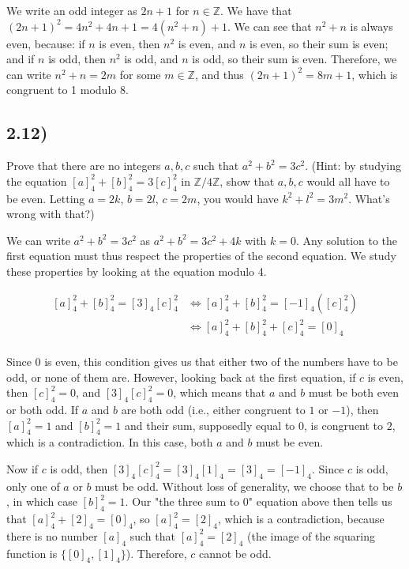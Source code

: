 \documentclass[12pt, letterpaper, twoside]{report}
\begin{document}
We write an odd integer as $2n + 1$ for $n \in \mathbb{Z}$. We have that $(2n + 1)^2 = 4n^2 + 4n + 1 = 4(n^2 + n) + 1$. We can see that $n^2 + n$ is always even, because: if $n$ is even, then $n^2$ is even, and $n$ is even, so their sum is even; and if $n$ is odd, then $n^2$ is odd, and $n$ is odd, so their sum is even. Therefore, we can write $n^2 + n = 2m$ for some $m \in \mathbb{Z}$, and thus $(2n + 1)^2 = 8m + 1$, which is congruent to 1 modulo 8.


\subsection*{2.12)}

Prove that there are no integers $a, b, c$ such that $a^2 + b^2 = 3c^2$. (Hint: by studying the equation $[a]^2_4 + [b]^2_4 = 3[c]^2_4$ in $\mathbb{Z}/4\mathbb{Z}$, show that $a, b, c$ would all have to be even. Letting $a = 2k$, $b = 2l$, $c = 2m$, you would have $k^2 + l^2 = 3m^2$. What's wrong with that?)

We can write $a^2 + b^2 = 3c^2$ as $a^2 + b^2 = 3c^2 + 4k$ with $k = 0$. Any solution to the first equation must thus respect the properties of the second equation. We study these properties by looking at the equation modulo 4.

$$
\begin{aligned}
[a]^2_4 + [b]^2_4 = [3]_4 [c]^2_4
&\Leftrightarrow [a]^2_4 + [b]^2_4 = [-1]_4 ([c]^2_4) \\
&\Leftrightarrow [a]^2_4 + [b]^2_4 + [c]^2_4 = [0]_4 \\
\end{aligned}
$$

Since 0 is even, this condition gives us that either two of the numbers have to be odd, or none of them are. However, looking back at the first equation, if $c$ is even, then $[c]^2_4 = 0$, and $[3]_4 [c]^2_4 = 0$, which means that $a$ and $b$ must be both even or both odd. If $a$ and $b$ are both odd (i.e., either congruent to $1$ or $-1$), then $[a]^2_4 = 1$ and $[b]^2_4 = 1$ and their sum, supposedly equal to $0$, is congruent to $2$, which is a contradiction. In this case, both $a$ and $b$ must be even.

Now if $c$ is odd, then $[3]_4 [c]^2_4 = [3]_4 [1]_4 = [3]_4 = [-1]_4$. Since $c$ is odd, only one of $a$ or $b$ must be odd. Without loss of generality, we choose that to be $b$, in which case $[b]^2_4 = 1$. Our "the three sum to 0" equation above then tells us that $[a]^2_4 + [2]_4 = [0]_4$, so $[a]^2_4 = [2]_4$, which is a contradiction, because there is no number $[a]_4$ such that $[a]^2_4 = [2]_4$ (the image of the squaring function is $\{ [0]_4, [1]_4 \}$). Therefore, $c$ cannot be odd.
\end{document}
